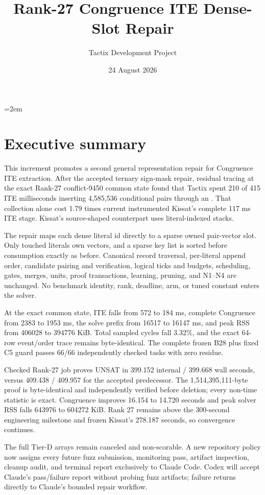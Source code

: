 \documentclass[11pt]{article}
\title{Rank-27 Congruence ITE Dense-Slot Repair}
\author{Tactix Development Project}
\date{24 August 2026}
\newcommand{\code}[1]{\texttt{\detokenize{#1}}}
\begin{document}
\emergencystretch=2em
\maketitle

\section*{Executive summary}
This increment promotes a second general representation repair for Congruence
ITE extraction.  After the accepted ternary sign-mask repair, residual tracing
at the exact Rank-27 conflict-9450 common state found that Tactix spent 210 of
415 ITE milliseconds inserting 4,585,536 conditional pairs through an
\code{unordered_map}.  That collection alone cost 1.79 times current
instrumented Kissat's complete 117 ms ITE stage.  Kissat's source-shaped
counterpart uses literal-indexed stacks.

The repair maps each dense literal id directly to a sparse owned pair-vector
slot.  Only touched literals own vectors, and a sparse key list is sorted before
consumption exactly as before.  Canonical record traversal, per-literal append
order, candidate pairing and verification, logical ticks and budgets,
scheduling, gates, merges, units, proof transactions, learning, pruning, and
N1--N4 are unchanged.  No benchmark identity, rank, deadline, arm, or tuned
constant enters the solver.

At the exact common state, ITE falls from 572 to 184 ms, complete Congruence
from 2383 to 1953 ms, the solve prefix from 16517 to 16147 ms, and peak RSS from
406028 to 394776 KiB.  Total sampled cycles fall 3.32\%, and the exact 64-row
event/order trace remains byte-identical.  The complete frozen B28 plus fixed
C5 guard passes 66/66 independently checked tasks with zero residue.

Checked Rank-27 job \code{1646031} proves UNSAT in 399.152 internal / 399.668
wall seconds, versus 409.438 / 409.957 for the accepted predecessor.  The
1,514,395,111-byte proof is byte-identical and independently verified before
deletion; every non-time statistic is exact.  Congruence improves 16.154 to
14.720 seconds and peak solver RSS falls 643976 to 604272 KiB.  Rank 27 remains
above the 300-second engineering milestone and frozen Kissat's 278.187 seconds,
so convergence continues.

The full Tier-D arrays remain canceled and non-scorable.  A new repository
policy now assigns every future fuzz submission, monitoring pass, artifact
inspection, cleanup audit, and terminal report exclusively to Claude Code.
Codex will accept Claude's pass/failure report without probing fuzz artifacts;
failure returns directly to Claude's bounded repair workflow.
\end{document}
